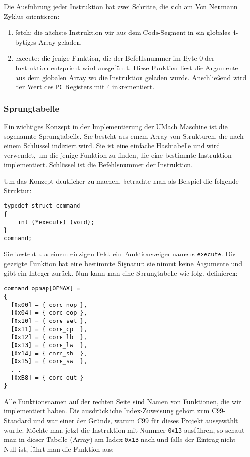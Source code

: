 Die Ausführung jeder Instruktion hat zwei Schritte, die sich am Von
Neumann Zyklus orientieren:
\begin{enumerate}
  \item fetch: die nächste Instruktion wir aus dem Code-Segment in ein globales
4-bytiges Array geladen. 
  \item execute: die jenige Funktion, die der Befehlsnummer im Byte 0 der
Instruktion entspricht wird ausgeführt. Diese Funktion liest die Argumente aus
dem globalen Array wo die Instruktion geladen wurde. Anschließend wird der Wert
des \texttt{PC} Registers mit 4 inkrementiert.
\end{enumerate}


\subsubsection{Sprungtabelle}

Ein wichtiges Konzept in der Implementierung der UMach Maschine ist die
sogenannte Sprungtabelle. Sie besteht aus einem Array von Strukturen, die nach
einem Schlüssel indiziert wird. Sie ist eine einfache Hashtabelle und wird
verwendet, um die jenige Funktion zu finden, die eine bestimmte Instruktion
implementiert. Schlüssel ist die Befehlsnummer der Instruktion.

Um das Konzept deutlicher zu machen, betrachte man als Beispiel die folgende
Struktur:
\begin{lstlisting}
typedef struct command 
{
    int (*execute) (void);
}
command;
\end{lstlisting}

Sie besteht aus einem einzigen Feld: ein Funktionszeiger namens
\texttt{execute}. Die gezeigte Funktion hat eine bestimmte Signatur: sie nimmt
keine Argumente und gibt ein Integer zurück. Nun kann man eine Sprungtabelle wie
folgt definieren:
\begin{lstlisting}
command opmap[OPMAX] = 
{
  [0x00] = { core_nop },
  [0x04] = { core_eop },
  [0x10] = { core_set },
  [0x11] = { core_cp  },
  [0x12] = { core_lb  },
  [0x13] = { core_lw  },
  [0x14] = { core_sb  },
  [0x15] = { core_sw  },
  ...
  [0xB8] = { core_out }
}
\end{lstlisting}

Alle Funktionsnamen auf der rechten Seite sind Namen von Funktionen, die wir
implementiert haben. Die ausdrückliche Index-Zuweisung gehört zum C99-Standard
und war einer der Gründe, warum C99 für dieses Projekt ausgewählt wurde. Möchte
man jetzt die Instruktion mit Nummer \texttt{0x13} ausführen, so schaut man in
dieser Tabelle (Array) am Index \texttt{0x13} nach und falls der Eintrag nicht
Null ist, führt man die Funktion aus:

